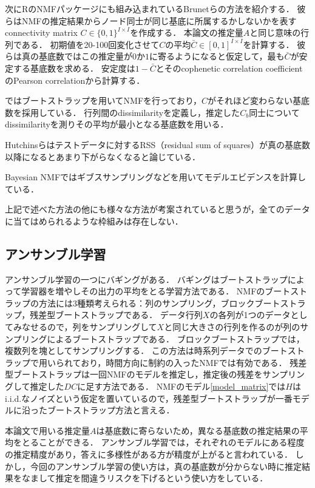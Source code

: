 次にRのNMFパッケージにも組み込まれているBrunetら\cite{Brunet2004}の方法を紹介する．
彼らはNMFの推定結果からノード同士が同じ基底に所属するかしないかを表すconnectivity matrix $C \in \{0, 1\}^{I \times I}$を作成する．
本論文の推定量$A$と同じ意味の行列である．
初期値を20-100回変化させて$C$の平均$\bar{C} \in [0, 1]^{I \times I}$を計算する．
彼らは真の基底数ではこの推定量が$0$か$1$に寄るようになると仮定して，最も$\bar{C}$が安定する基底数を求める．
安定度は$1- \bar{C}$とそのcophenetic correlation coefficientのPearson correlationから計算する．

\cite{Ubaru2017}ではブートストラップを用いてNMFを行っており，$C$がそれほど変わらない基底数を採用している．
行列間のdissimilarityを定義し，推定した$C_b$同士についてdissimilarityを測りその平均が最小となる基底数を用いる．

Hutchinsらはテストデータに対するRSS（residual sum of squares）が真の基底数以降になるとあまり下がらなくなると論じている\cite{Hutchins2008}．

Bayesian NMFではギブスサンプリングなどを用いてモデルエビデンスを計算している\cite{Cemgil2009}．

上記で述べた方法の他にも様々な方法が考案されていると思うが，全てのデータに当てはめられるような枠組みは存在しない．

\subsection{アンサンブル学習}
アンサンブル学習の一つにバギング\cite{Breiman1996}がある．
バギングはブートストラップ\cite{Efron1979}によって学習器を増やしその出力の平均をとる学習方法である．
NMFのブートストラップの方法には3種類考えられる：列のサンプリング，ブロックブートストラップ，残差型ブートストラップである．
データ行列$X$の各列が1つのデータとしてみなせるので，列をサンプリングして$X$と同じ大きさの行列を作るのが列のサンプリングによるブートストラップである．
ブロックブートストラップでは，複数列を塊としてサンプリングする．
この方法は時系列データでのブートストラップで用いられており，時間方向に制約の入ったNMFでは有効である．
残差型ブートストラップは一回NMFのモデルを推定し，推定後の残差をサンプリングして推定した$DC$に足す方法である．
NMFのモデル\ref{model_matrix}では$H$はi.i.d.なノイズという仮定を置いているので，残差型ブートストラップが一番モデルに沿ったブートストラップ方法と言える．

本論文で用いる推定量$A$は基底数に寄らないため，異なる基底数の推定結果の平均をとることができる．
アンサンブル学習では，それぞれのモデルにある程度の推定精度があり\cite{Kittler1998}，答えに多様性がある方が精度が上がる\cite{Kuncheva2006}と言われている．
しかし，今回のアンサンブル学習の使い方は，真の基底数が分からない時に推定結果をなまして推定を間違うリスクを下げるという使い方をしている．

